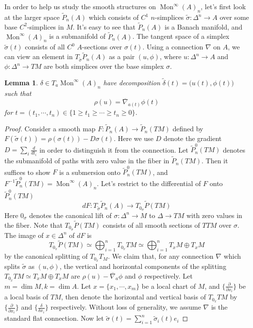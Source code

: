 \documentclass[12pt]{amsart}
\newtheorem{lem}[thm]{Lemma}
\theoremstyle{definition}
\theoremstyle{remark}
\numberwithin{equation}{section}
\newcommand{\del}{\partial}
\renewcommand{\del}{\partial}
\newcommand{\1}{{\mathbb{1}}}
\newcommand{\mon}{\operatorname{Mon}}
\begin{document}
In order to help us study the smooth structures on $\mon^{\infty}(A)_n$, let's first look at the larger space $\tilde{P}_n(A)$ which consists of $C^1$ $n$-simplices $\tilde{\sigma}: \Delta^n \to A$ over some base $C^2$-simplices in $M$. It's easy to see that $\tilde{P}_n(A)$ is a Banach manifold, and $\mon^{\infty}(A)_{n}$ is a submanifold of $\tilde{P}_n(A)$. The tangent space of a simplex $\tilde{\sigma}(t)$ consists of all $C^0$ $A$-sections over $\sigma(t)$. Using a connection $\nabla$ on $A$, we can view an element in $T_{\tilde{\sigma}}\tilde{P}_n(A)$ as a pair $(u, \phi)$, where $u: \Delta^n \to A$ and $\phi: \Delta^n \to TM$ are both simplices over the base simplex $\sigma$.

\begin{lem}
$\delta \in T_a \mon^{\infty}(A)_n$ have decomposition $\tilde{\delta}(t) = \big(u(t), \phi(t) \big)$ such that 
\begin{equation*}
    \rho(u) = \overline{\nabla}_{a(t)}\phi(t)
\end{equation*}
for $t = (t_1, \cdots, t_n) \in \{1 \ge t_1 \ge \cdots \ge  t_n \ge 0\}$.

\end{lem}
\begin{proof}
Consider a smooth map $F: \tilde{P}_n(A) \to \tilde{P}_n(TM)$ defined by $F(\tilde{\sigma}(t)) = \rho(\sigma(t)) - D  \sigma(t)$. Here we use $D$ denote the gradient $D = \sum_i \frac{d}{dt_i}$ in order to distinguish it from the connection. Let $\tilde{P}_n^0(TM)$ denotes the submanifold of paths with zero value in the fiber in $\tilde{P}_n(TM)$. Then it suffices to show $F$ is a submersion onto $\tilde{P}_n^0(TM)$, and $F^{-1}\tilde{P}_n^0(TM)= \mon^{\infty}(A)_n$. 
Let's restrict to the differential of $F$ onto $\tilde{P}_n^0(TM)$
\begin{equation*}
    dF: T_{\tilde{\sigma}}\tilde{P}_n(A) \to T_{0_{\sigma}}\tilde{P}(TM)
\end{equation*}
Here $0_{\sigma}$ denotes the canonical lift of $\sigma :\Delta^n \to M$ to $\Delta \to TM$ with zero values in the fiber. 
Note that $T_{0_{\sigma}}\tilde{P}(TM)$ consists of all smooth sections of $TTM$ over $\sigma$. The image of $x \in \Delta^n$ of $dF$ is 
    $$T_{0_x}\tilde{P}(TM) \simeq \bigoplus_{i=1}^{n} T_{0_x} TM
    \simeq  \bigoplus_{i=1}^{n} T_xM\oplus T_xM
    $$
    by the canonical splitting of $T_{0_x} T_M$. We claim that, for any connection $\nabla$ which splits $\tilde{\sigma}$ as $(u, \phi)$, the vertical and horizontal components of the splitting $T_{0_x} TM
    \simeq  T_xM\oplus T_xM$ are $\rho(u) - \overline{\nabla}_a \phi$ and $\phi$ respectively.
    Let $m = \dim M, k = \dim A$. Let $x = \{x_1, \cdots, x_m\}$ be a local chart of $M$, and $\{ \frac{\del}{\del x_i} \}$ be a local basis of $TM$, then denote the horizontal and vertical basis of $T_{0_x}TM$ by  $\{ \frac{\del}{\del x_i} \}$ and $\{ \frac{\delta}{\delta x_i} \}$ respectively. Without loss of generality, we assume $\nabla$ is the standard flat connection.
    Now let $\tilde{\sigma}(t) = \sum_{i = 1}^n  \tilde{\sigma}_i(t) e_i$
     
    
\end{proof}
\end{document}
